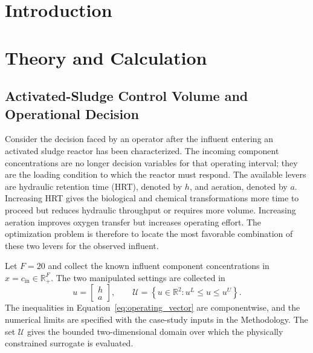 \documentclass[a4paper,fleqn]{cas-sc}
\newcommand{\R}{\mathbb{R}}
\begin{document}
\section{Introduction}

\section{Theory and Calculation}

\subsection{Activated-Sludge Control Volume and Operational Decision}

Consider the decision faced by an operator after the influent entering an activated sludge reactor has been characterized. The incoming component concentrations are no longer decision variables for that operating interval; they are the loading condition to which the reactor must respond. The available levers are hydraulic retention time (HRT), denoted by $h$, and aeration, denoted by $a$. Increasing HRT gives the biological and chemical transformations more time to proceed but reduces hydraulic throughput or requires more volume. Increasing aeration improves oxygen transfer but increases operating effort. The optimization problem is therefore to locate the most favorable combination of these two levers for the observed influent.

Let $F=20$ and collect the known influent component concentrations in $x=c_{\mathrm{in}}\in\R_+^F$. The two manipulated settings are collected in
\begin{equation}
\label{eq:operating_vector}
u=\begin{bmatrix}h\\a\end{bmatrix},
\qquad
\mathcal U=\left\{u\in\R^2:u^L\leq u\leq u^U\right\}.
\end{equation}
The inequalities in Equation~\eqref{eq:operating_vector} are componentwise, and the numerical limits are specified with the case-study inputs in the Methodology. The set $\mathcal U$ gives the bounded two-dimensional domain over which the physically constrained surrogate is evaluated.
\end{document}

